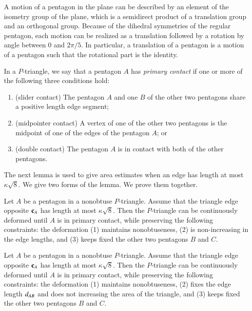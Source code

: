 \begin{remark}
A motion of a pentagon in the plane can be described by an element of the isometry group of
the plane, which is a semidirect product of a translation group and an orthogonal group.  
Because of the dihedral
symmetries of the regular pentagon, each motion can be realized as a translation followed
by a rotation by angle between $0$ and $2\pi/5$.   In particular, a translation of a pentagon is a motion of
a pentagon such that the rotational part is the identity.
\end{remark}


\begin{definition}
In a $P$-triangle, we say that a pentagon $A$ has {\it primary
  contact} if one or more of the following three conditions hold:
\begin{enumerate}
\item (slider contact) The pentagon $A$ and one $B$ of the other two pentagons
share a positive length edge segment;
\item (midpointer contact)  A vertex of one of the other two pentagons
is  the midpoint of one of the edges of the pentagon $A$; or
\item (double contact) The pentagon $A$ is in contact
with both of the other pentagons.
\end{enumerate}
\end{definition}

The next lemma is used to give area
estimates when an edge has length at most $\kappa\sqrt{8}$.
We give two forms of the lemma.  We prove them together.

\begin{lemma} 
  Let $A$ be a pentagon in a nonobtuse $P$-triangle.  Assume that the
  triangle edge opposite ${\mathbf c}_A$ has length at most $\kappa\sqrt{8}$.
  Then the $P$-triangle can be continuously deformed until $A$ is in
  primary contact, while preserving the following constraints: the
  deformation (1) maintains nonobtuseness, (2) is non-increasing in
  the edge lengths, and (3) keeps fixed the other two pentagons $B$
  and $C$.
\end{lemma}

\begin{lemma} 
  Let $A$ be a pentagon in a nonobtuse $P$-triangle.  Assume that the
  triangle edge opposite ${\mathbf c}_A$ has length at most $\kappa\sqrt{8}$.
  Then the $P$-triangle can be continuously deformed until $A$ is in
  primary contact, while preserving the following constraints: the
  deformation (1) maintains nonobtuseness, (2) fixes the
edge length $d_{AB}$ and does not increasing  the area of the triangle, 
and (3) keeps fixed the other two pentagons $B$
  and $C$.
\end{lemma}

